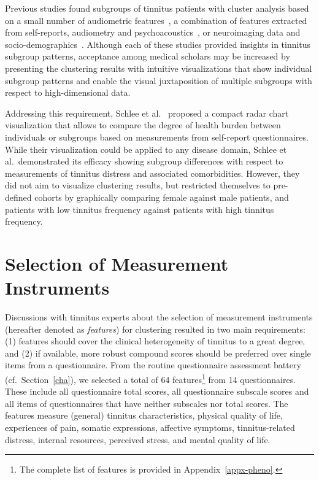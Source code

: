 \documentclass[
  oneside]{book}
\begin{document}
Previous studies found subgroups of tinnitus patients with cluster analysis based on a small number of audiometric features~\autocite{Langguth:LCA2017}, a combination of features extracted from self-reports, audiometry and psychoacoustics~\autocite{Tyler:TinnitusClustering2008}, or neuroimaging data and
socio-demographics~\autocite{Schecklmann:BrainResearch2012}.
Although each of these studies provided insights in tinnitus subgroup patterns, acceptance among medical scholars may be increased by presenting the clustering results with intuitive visualizations that show individual subgroup patterns and enable the visual juxtaposition of multiple subgroups with respect to high-dimensional data.

Addressing this requirement, Schlee et al.~\autocite{Schlee:RadarVis2017} proposed a compact radar chart visualization that allows to compare the degree of health burden between individuals or subgroups based on measurements from self-report questionnaires.
While their visualization could be applied to any disease domain, Schlee et al.~demonstrated its efficacy showing subgroup differences with respect to measurements of tinnitus distress and associated comorbidities.
However, they did not aim to visualize clustering results, but restricted themselves to pre-defined cohorts by graphically comparing female against male patients, and patients with low tinnitus frequency against patients with high tinnitus frequency.

\hypertarget{phenotypes-features}{%
\section{Selection of Measurement Instruments}\label{phenotypes-features}}

Discussions with tinnitus experts about the selection of measurement instruments (hereafter denoted as \emph{features}) for clustering resulted in two main requirements:
(1) features should cover the clinical heterogeneity of tinnitus to a great degree, and
(2) if available, more robust compound scores should be preferred over single items from a questionnaire.
From the routine questionnaire assessment battery (cf.~Section~\ref{cha}), we selected a total of 64 features\footnote{The complete list of features is provided in Appendix~\ref{appx-pheno}.} from 14 questionnaires.
These include all questionnaire total scores, all questionnaire subscale scores and all items of questionnaires that have neither subscales nor total scores.
The features measure
(general) tinnitus characteristics,
physical quality of life,
experiences of pain,
somatic expressions,
affective symptoms,
tinnitus-related distress,
internal resources,
perceived stress, and
mental quality of life.
\end{document}
